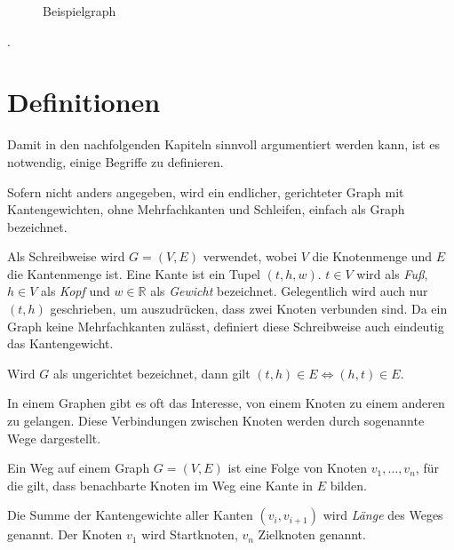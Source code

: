\begin{figure}
    \caption{Beispielgraph}
\end{figure}

.

\section{Definitionen}
Damit in den nachfolgenden Kapiteln sinnvoll argumentiert werden kann, ist es notwendig, einige Begriffe zu definieren.

\begin{definition}[Graph]
    Sofern nicht anders angegeben, wird ein endlicher, gerichteter Graph mit Kantengewichten, ohne Mehrfachkanten und Schleifen, einfach als Graph bezeichnet.

    Als Schreibweise wird $G = (V, E)$ verwendet, wobei $V$ die Knotenmenge und $E$ die Kantenmenge ist. Eine Kante ist ein Tupel $(t, h, w)$. $t \in V$ wird als \emph{Fuß}, $h \in V$ als \emph{Kopf} und $w \in \mathbb{R}$ als \emph{Gewicht} bezeichnet. Gelegentlich wird auch nur $(t, h)$ geschrieben, um auszudrücken, dass zwei Knoten verbunden sind. Da ein Graph keine Mehrfachkanten zulässt, definiert diese Schreibweise auch eindeutig das Kantengewicht.

    Wird $G$ als ungerichtet bezeichnet, dann gilt $(t, h) \in E \Leftrightarrow (h, t) \in E$.
\end{definition}

In einem Graphen gibt es oft das Interesse, von einem Knoten zu einem anderen zu gelangen.
Diese Verbindungen zwischen Knoten werden durch sogenannte Wege dargestellt.

\begin{definition}[Weg]
    Ein Weg auf einem Graph $G = (V, E)$ ist eine Folge von Knoten $v_1, \dotsc, v_n$, für die gilt, dass benachbarte Knoten im Weg eine Kante in $E$ bilden.


    Die Summe der Kantengewichte aller Kanten $(v_i, v_{i + 1})$ wird \emph{Länge} des Weges genannt. Der Knoten $v_1$ wird Startknoten, $v_n$ Zielknoten genannt.
\end{definition}

